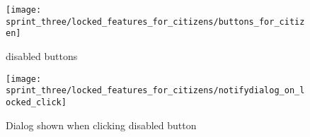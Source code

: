 \begin{figure}[!htbp]
        \centering
        \texttt{[image: sprint\_three/locked\_features\_for\_citizens/buttons\_for\_citizen]}
        \caption{\ct disabled buttons}
        \label{fig:ct_disabled_buttons}
\end{figure}

\begin{figure}[!htbp]
        \centering
        \texttt{[image: sprint\_three/locked\_features\_for\_citizens/notifydialog\_on\_locked\_click]}
        \caption{Dialog shown when clicking disabled button}
        \label{fig:notifydialog_on_locked_click}
\end{figure}
